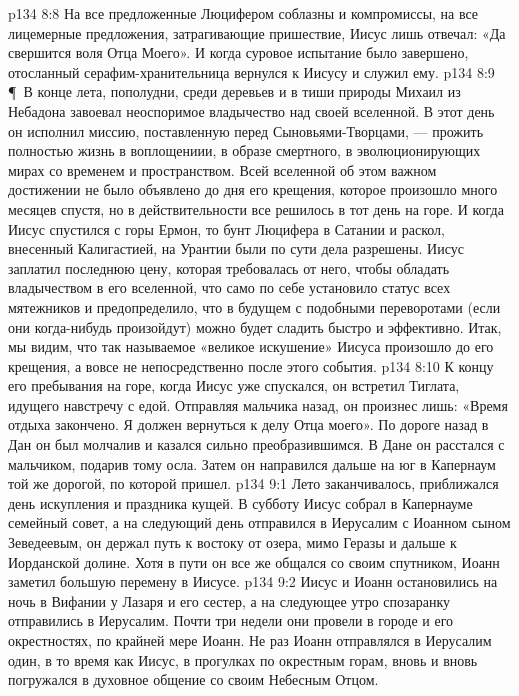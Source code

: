 \vs p134 8:8 На все предложенные Люцифером соблазны и компромиссы, на все лицемерные предложения, затрагивающие пришествие, Иисус лишь отвечал: «Да свершится воля Отца Моего». И когда суровое испытание было завершено, отосланный серафим\hyp{}хранительница вернулся к Иисусу и служил ему.
\vs p134 8:9 \P\ В конце лета, пополудни, среди деревьев и в тиши природы Михаил из Небадона завоевал неоспоримое владычество над своей вселенной. В этот день он исполнил миссию, поставленную перед Сыновьями\hyp{}Творцами, --- прожить полностью жизнь в воплощениии, в образе смертного, в эволюционирующих мирах со временем и пространством. Всей вселенной об этом важном достижении не было объявлено до дня его крещения, которое произошло много месяцев спустя, но в действительности все решилось в тот день на горе. И когда Иисус спустился с горы Ермон, то бунт Люцифера в Сатании и раскол, внесенный Калигастией, на Урантии были по сути дела разрешены. Иисус заплатил последнюю цену, которая требовалась от него, чтобы обладать владычеством в его вселенной, что само по себе установило статус всех мятежников и предопределило, что в будущем с подобными переворотами (если они когда\hyp{}нибудь произойдут) можно будет сладить быстро и эффективно. Итак, мы видим, что так называемое «великое искушение» Иисуса произошло до его крещения, а вовсе не непосредственно после этого события.
\vs p134 8:10 К концу его пребывания на горе, когда Иисус уже спускался, он встретил Тиглата, идущего навстречу с едой. Отправляя мальчика назад, он произнес лишь: «Время отдыха закончено. Я должен вернуться к делу Отца моего». По дороге назад в Дан он был молчалив и казался сильно преобразившимся. В Дане он расстался с мальчиком, подарив тому осла. Затем он направился дальше на юг в Капернаум той же дорогой, по которой пришел.
\vs p134 9:1 Лето заканчивалось, приближался день искупления и праздника кущей. В субботу Иисус собрал в Капернауме семейный совет, а на следующий день отправился в Иерусалим с Иоанном сыном Зеведеевым, он держал путь к востоку от озера, мимо Геразы и дальше к Иорданской долине. Хотя в пути он все же общался со своим спутником, Иоанн заметил большую перемену в Иисусе.
\vs p134 9:2 Иисус и Иоанн остановились на ночь в Вифании у Лазаря и его сестер, а на следующее утро спозаранку отправились в Иерусалим. Почти три недели они провели в городе и его окрестностях, по крайней мере Иоанн. Не раз Иоанн отправлялся в Иерусалим один, в то время как Иисус, в прогулках по окрестным горам, вновь и вновь погружался в духовное общение со своим Небесным Отцом.
